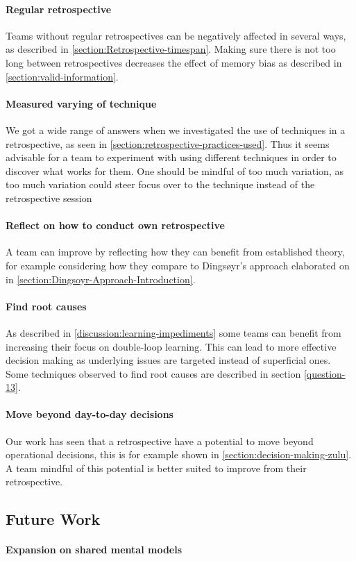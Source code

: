 \paragraph{Regular retrospective}
Teams without regular retrospectives can be negatively affected in several ways, as described in \autoref{section:Retrospective-timespan}. Making sure there is not too long between retrospectives decreases the effect of memory bias as described in \autoref{section:valid-information}.

\paragraph{Measured varying of technique}
We got a wide range of answers when we investigated the use of techniques in a retrospective, as seen in \autoref{section:retrospective-practices-used}. Thus it seems advisable for a team to experiment with using different techniques in order to discover what works for them. One should be mindful of too much variation, as too much variation could steer focus over to the technique instead of the retrospective session

\paragraph{Reflect on how to conduct own retrospective} %
A team can improve by reflecting how they can benefit from established theory, for example considering how they compare to Dingsøyr's approach elaborated on in \autoref{section:Dingsoyr-Approach-Introduction}.


\paragraph{Find root causes}
As described in \autoref{discussion:learning-impediments} some teams can benefit from increasing their focus on double-loop learning. This can lead to more effective decision making as underlying issues are targeted instead of superficial ones. Some techniques observed to find root causes are described in section \autoref{question-13}.

\paragraph{Move beyond day-to-day decisions}
Our work has seen that a retrospective have a potential to move beyond operational decisions, this is for example shown in \autoref{section:decision-making-zulu}. A team mindful of this potential is better suited to improve from their retrospective.


 
\subsection{Future Work}

\paragraph{Expansion on shared mental models}


\clearpage
